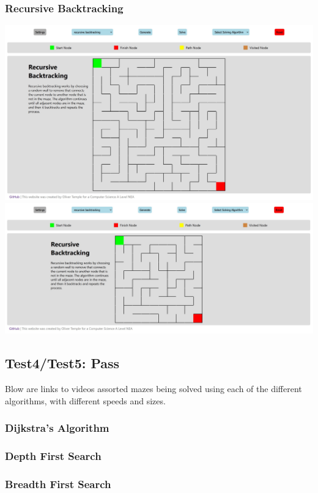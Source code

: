 \documentclass[titlepage]{article}
\begin{document}
\subsubsection{Recursive Backtracking}
\includegraphics[width=\linewidth]{assets/testing/test3c.jpg}
\includegraphics[width=\linewidth]{assets/testing/test3d.jpg}

\subsection{Test4/Test5: Pass}
Blow are links to videos assorted mazes being solved using each of the different algorithms, with different speeds and sizes.
\subsubsection{Dijkstra's Algorithm}

\subsubsection{Depth First Search}

\subsubsection{Breadth First Search}
\end{document}
